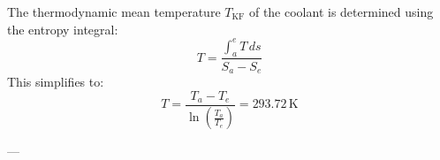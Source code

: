 The thermodynamic mean temperature \( T_{\text{KF}} \) of the coolant is determined using the entropy integral:  
\[
T = \frac{\int_a^e T \, ds}{S_a - S_e}
\]  
This simplifies to:  
\[
T = \frac{T_a - T_e}{\ln\left(\frac{T_a}{T_e}\right)} = 293.72 \, \text{K}
\]  

---